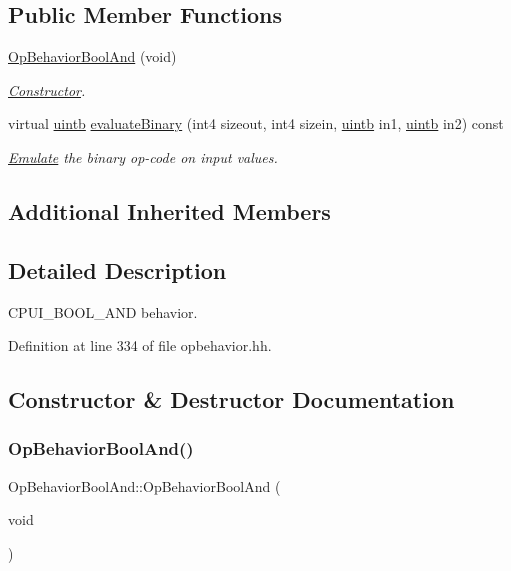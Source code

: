 \subsection*{Public Member Functions}
\begin{DoxyCompactItemize}
\item 
\mbox{\hyperlink{class_op_behavior_bool_and_a46383737cceb5e4552988d263e45ae5e}{Op\+Behavior\+Bool\+And}} (void)
\begin{DoxyCompactList}\small\item\em \mbox{\hyperlink{class_constructor}{Constructor}}. \end{DoxyCompactList}\item 
virtual \mbox{\hyperlink{types_8h_a2db313c5d32a12b01d26ac9b3bca178f}{uintb}} \mbox{\hyperlink{class_op_behavior_bool_and_aac60f2127c5f97be79123f83346c7036}{evaluate\+Binary}} (int4 sizeout, int4 sizein, \mbox{\hyperlink{types_8h_a2db313c5d32a12b01d26ac9b3bca178f}{uintb}} in1, \mbox{\hyperlink{types_8h_a2db313c5d32a12b01d26ac9b3bca178f}{uintb}} in2) const
\begin{DoxyCompactList}\small\item\em \mbox{\hyperlink{class_emulate}{Emulate}} the binary op-\/code on input values. \end{DoxyCompactList}\end{DoxyCompactItemize}
\subsection*{Additional Inherited Members}


\subsection{Detailed Description}
C\+P\+U\+I\+\_\+\+B\+O\+O\+L\+\_\+\+A\+ND behavior. 

Definition at line 334 of file opbehavior.\+hh.



\subsection{Constructor \& Destructor Documentation}
\mbox{\label{class_op_behavior_bool_and_a46383737cceb5e4552988d263e45ae5e}} 
\subsubsection{\texorpdfstring{OpBehaviorBoolAnd()}{OpBehaviorBoolAnd()}}
{\footnotesize\ttfamily Op\+Behavior\+Bool\+And\+::\+Op\+Behavior\+Bool\+And (\begin{DoxyParamCaption}\item[{void}]{ }\end{DoxyParamCaption})\hspace{0.3cm}{\ttfamily [inline]}}



